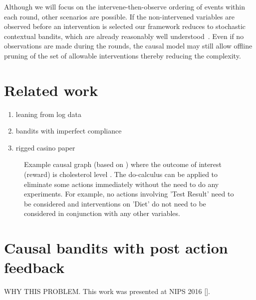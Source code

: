 \documentclass[11pt,a4paper,oneside]{book}
\begin{document}
Although we will focus on the intervene-then-observe ordering of events within each round, other scenarios are possible. If the non-intervened variables are observed before an intervention is selected our framework reduces to stochastic contextual bandits, which are already reasonably well understood~\citep{Agarwal2014}. Even if no observations are made during the rounds, the causal model may still allow offline pruning of the set of allowable interventions thereby reducing the complexity.


\section*{Related work}
\begin{enumerate}
\item leaning from log data
\item bandits with imperfect compliance
\item rigged casino paper
\end{enumerate}

\begin{figure}[h]
\caption{Example causal graph (based on \cite{Koller2009}) where the outcome of interest (reward) is cholesterol level . The do-calculus can be applied to eliminate some actions immediately without the need to do any experiments. For example, no actions involving 'Test Result' need to be considered and interventions on 'Diet' do not need to be considered in conjunction with any other variables.}
\label{fig:cholesterol_graph}
\centering
{}
\end{figure}


\section*{Causal bandits with post action feedback}
WHY THIS PROBLEM. This work was presented at NIPS 2016 \ref{}.
\end{document}
